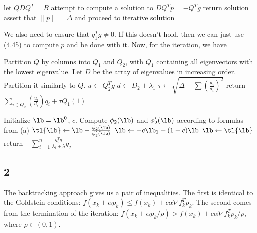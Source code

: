 \documentclass{article}
\newcommand{\ep}{\epsilon}
\begin{document}
\begin{algorithmic}
    \State let $QDQ^T=B$
        \State attempt to compute a solution to $DQ^Tp=-Q^Tg$
                \State return solution
            \EndIf
        \EndIf
    \EndIf
    \State assert that $\|p\|=\Delta$ and proceed to iterative solution
\end{algorithmic}

We also need to ensure that $q_1^Tg\neq0$. If this doesn't hold, then we can just use (4.45) to compute $p$ and be done with it. Now, for the iteration, we have

\begin{algorithmic}
    \State Partition $Q$ by columns into $Q_1$ and $Q_2$, with $Q_1$ containing all eigenvectors with the lowest eigenvalue.
    \State Let $D$ be the array of eigenvalues in increasing order. Partition it similarly to $Q$.
        \State $u\gets Q_2^Tg$
        \State $d\gets D_2+\lambda_1$
        \State $\tau\gets\sqrt{\Delta-\sum\left(\frac{u_i}{d_i}\right)^2}$
        \State return $\sum_{i\in Q_2}\left(\frac{u_i}{d_i}\right)q_i+\tau Q_1(1)$
    \EndIf

    \State Initialize $\lb=\lb^0$, $c$.
    \While{$|\phi_2(\lb)|>\ep$}
        \State Compute $\phi_2(\lb)$ and $\phi_2'(\lb)$ according to formulas from (a)
        \State $\tl{\lb}\gets\lb-\frac{\phi_2(\lb)}{\phi_2'(\lb)}$
            \State $\lb\gets-c\lb_1+(1-c)\lb$
        \Else
            \State $\lb\gets\tl{\lb}$
        \EndIf
    \EndWhile
    \State return $-\sum_{i=1}^n\frac{q_i^Tg}{\lambda_i+\lambda}q_j$
\end{algorithmic}
\subsection*{2}
The backtracking approach gives us a pair of inequalities. The first is identical to the Goldstein conditions:  $f(x_k+\alpha p_k)\leq f(x_k)+c\alpha\nabla f_k^Tp_k$. The second comes from the termination of the iteration: $f(x_k+\alpha p_k/\rho)>f(x_k)+c\alpha\nabla f_k^Tp_k/\rho$, where $\rho\in(0,1)$. 
\end{document}
